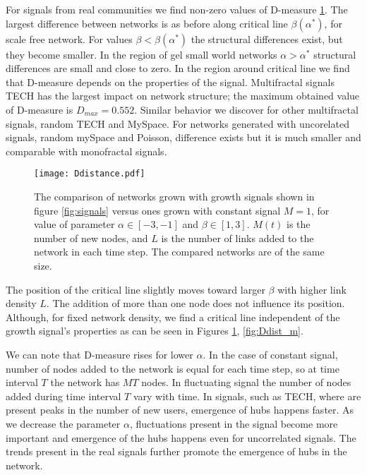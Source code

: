
For signals from real communities we find non-zero values of D-measure \ref{fig:dmeasure}. The largest difference between networks is as before along critical line $\beta(\alpha^{*})$, for scale free network. For values $\beta<\beta(\alpha^{*})$ the structural differences exist, but they become smaller. In the region of gel small world networks $\alpha>\alpha^{*}$ structural differences are small and close to zero. In the region around critical line we find that D-measure depends on the properties of the signal. Multifractal signals TECH has the largest impact on network structure; the maximum obtained value of D-measure is $D_{max}=0.552$. Similar behavior we discover for other multifractal signals, random TECH and MySpace. For networks generated with uncorelated signals, random mySpace and Poisson, difference exists but it is much smaller and comparable with monofractal signals.  


\begin{figure}[h!]
	\centering
	\texttt{[image: Ddistance.pdf]}
	\caption{The comparison of networks grown with growth signals shown in figure \ref{fig:signals} versus ones grown with constant signal $M=1$, for value of parameter $\alpha\in[-3,-1]$ and $\beta\in[1,3]$. $M(t)$ is the number of new nodes, and $L$ is the number of links added to the network in each time step. The compared networks are of the same size.}
	\label{fig:dmeasure}
\end{figure}

The position of the critical line slightly moves toward larger $\beta$ with higher link density $L$. The addition of more than one node does not influence its position. Although, for fixed network density, we find a critical line independent of the growth signal's properties as can be seen in Figures \ref{fig:dmeasure}, \ref{fig:Ddist_m}. 

We can note that D-measure rises for lower $\alpha$. In the case of constant signal, number of nodes added to the network is equal for each time step, so at time interval $T$ the network has $MT$ nodes. In fluctuating signal the number of nodes  added during time interval $T$ vary with time. In signals, such as TECH, where are present peaks in the number of new users, emergence of hubs happens faster. As we decrease the parameter $\alpha$, fluctuations present in the signal become more important and emergence of the hubs happens even for uncorrelated signals. The trends present in the real signals further promote the emergence of hubs in the network.    


